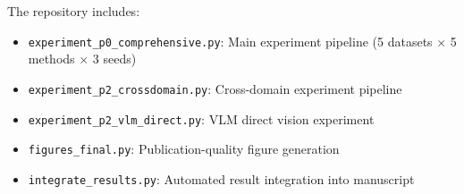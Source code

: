 \documentclass[12pt]{article}
\begin{document}
The repository includes:
\begin{itemize}
    \item \texttt{experiment\_p0\_comprehensive.py}: Main experiment pipeline (5 datasets $\times$ 5 methods $\times$ 3 seeds)
    \item \texttt{experiment\_p2\_crossdomain.py}: Cross-domain experiment pipeline
    \item \texttt{experiment\_p2\_vlm\_direct.py}: VLM direct vision experiment
    \item \texttt{figures\_final.py}: Publication-quality figure generation
    \item \texttt{integrate\_results.py}: Automated result integration into manuscript
\end{itemize}
\end{document}
